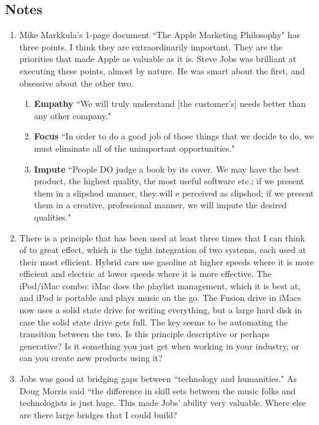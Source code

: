\documentclass[11pt, oneside]{article}   	%
\begin{document}
\subsection{Notes}
\begin{enumerate}
\item Mike Markkula's 1-page document ``The Apple Marketing Philosophy" has three points.  I think they are extraordinarily important.  They are the priorities that made Apple as valuable as it is.  Steve Jobs was brilliant at executing these points, almost by nature.  He was smart about the first, and obsessive about the other two.

\begin{enumerate}
\item \textbf{Empathy} ``We will truly understand [the customer's] needs better than any other company."
\item \textbf{Focus} ``In order to do a good job of those things that we decide to do, we must eliminate all of the unimportant opportunities."
\item \textbf{Impute} ``People DO judge a book by its cover.  We may have the best product, the highest quality, the most useful software etc.; if we present them in a slipshod manner, they will e perceived as slipshod; if we present them in a creative, professional manner, we will impute the desired qualities."
\end{enumerate}  


\item There is a principle that has been used at least three times that I can think of to great effect, which is the tight integration of two systems, each used at their most efficient.  Hybrid cars use gasoline at higher speeds where it is more efficient and electric at lower speeds where it is more effective.  The iPod/iMac combo: iMac does the playlist management, which it is best at, and iPod is portable and plays music on the go.  The Fusion drive in iMacs now uses a solid state drive for writing everything, but a large hard disk in case the solid state drive gets full.  The key seems to be automating the transition between the two.  Is this principle descriptive or perhaps generative?  Is it something you just get when working in your industry, or can you create new products using it?

\item Jobs was good at bridging gaps between ``technology and humanities."  As Doug Morris said ``the difference in skill sets between the music folks and technologists is just huge.  This  made Jobs' ability very valuable.  Where else are there large bridges that I could build?


\end{enumerate}
\end{document}

